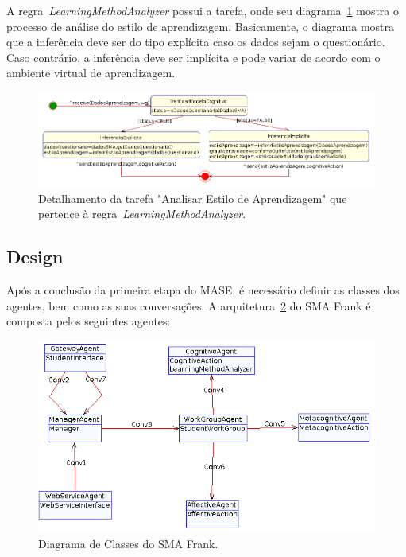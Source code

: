 A regra~\emph{LearningMethodAnalyzer} possui a tarefa, onde seu diagrama~\ref{fig:td-analise-aprendizagem} mostra o processo de análise do estilo de aprendizagem. Basicamente, o diagrama mostra que a inferência deve ser do tipo explícita caso os dados sejam o questionário. Caso contrário, a inferência deve ser implícita e pode variar de acordo com o ambiente virtual de aprendizagem.
\begin{figure}
	\centering
	\includegraphics[scale=0.48]{images/td-analise-aprendizagem.png}
	\caption{Detalhamento da tarefa "Analisar Estilo de Aprendizagem" que pertence à regra~\emph{LearningMethodAnalyzer}.}
	\label{fig:td-analise-aprendizagem}
\end{figure}

\subsection{Design}\label{subsection:design}

Após a conclusão da primeira etapa do MASE, é necessário definir as classes dos agentes, bem como as suas conversações. A arquitetura~\ref{fig:agent-class-diagram} do SMA Frank é composta pelos seguintes agentes:

\begin{figure}
	\centering
	\includegraphics[scale=0.48]{images/agent-class-diagram.png}
	\caption{Diagrama de Classes do SMA Frank.}
	\label{fig:agent-class-diagram}
\end{figure}

